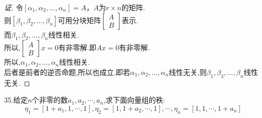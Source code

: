 \documentclass[10pt,a4paper]{report}
\begin{document}
\begin{proof}[证]
	令$[\alpha_{1},\alpha_{2},...,\alpha_{n}] = A$，$A$为$r \times n$的矩阵.\\
	则$[\beta_{1},\beta_{2},...,\beta_{n}]$可用分块矩阵$\left[
	\begin{matrix}
	A\\
	B
	\end{matrix}
	\right]$表示.\\
	而$\beta_{1},\beta_{2},...,\beta_{n}$线性相关.\\
	所以,$\left[
	\begin{matrix}
	A\\
	B
	\end{matrix}
	\right]x=0$有非零解.即$Ax=0$有非零解.\\
	所以,$\alpha_{1},\alpha_{2},...,\alpha_{n}$线性相关.\\
	后者是前者的逆否命题,所以也成立.即若$\alpha_{1},\alpha_{2},...,\alpha_{n}$线性无关,则$\beta_{1},\beta_{2},...,\beta_{n}$线性无关.
\end{proof}
\noindent 35.给定$n$个非零的数$a_{1}, a_{2}, \cdots, a_{n}$,求下面向量组的秩:
$$
\eta_{1} = [1+a_{1}, 1, \cdots, 1],\eta_{2} = [1, 1+a_{2}, \cdots, 1],\cdots, \eta_{n} = [1, 1, \cdots, 1+a_{n}]
$$
\end{document}
